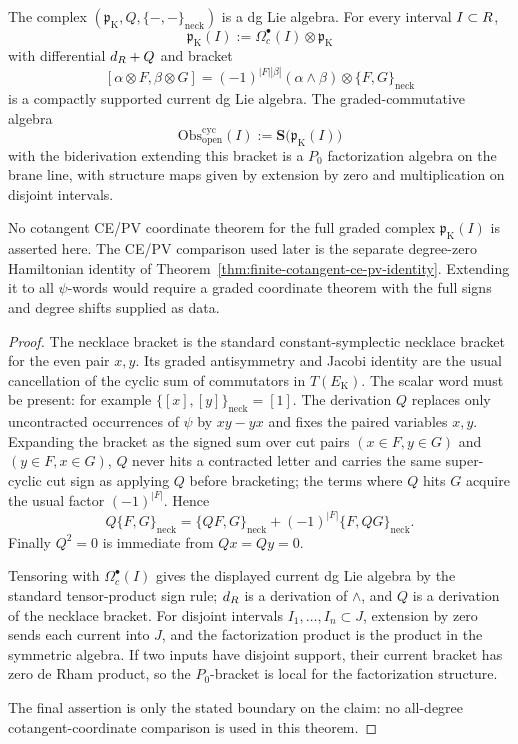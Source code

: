 \documentclass[11pt]{memoir}
\begin{document}
\begin{thm}
\label{thm:primitive-cyclic-koszul-p0-model}
  The complex
  \((\mathfrak p_{\mathrm K},Q,\{-,-\}_{\mathrm{neck}})\) is a dg Lie
  algebra.  For every interval \(I\subset R\),
  \[
    \mathfrak p_{\mathrm K}(I)
      :=\Omega_c^\bullet(I)\otimes\mathfrak p_{\mathrm K}
  \]
  with differential \(d_{R}+Q\) and bracket
  \[
    [\alpha\otimes F,\beta\otimes G]
      =(-1)^{|F||\beta|}(\alpha\wedge\beta)\otimes
        \{F,G\}_{\mathrm{neck}}
  \]
  is a compactly supported current dg Lie algebra.  The graded-commutative
  algebra
  \[
    \mathrm{Obs}^{\mathrm{cyc}}_{\mathrm{open}}(I)
      :=\mathbf S\bigl(\mathfrak p_{\mathrm K}(I)\bigr)
  \]
  with the biderivation extending this bracket is a \(P_0\)
  factorization algebra on the brane line, with structure maps given by
  extension by zero and multiplication on disjoint intervals.

  No cotangent CE/PV coordinate theorem for the full graded complex
  \(\mathfrak p_{\mathrm K}(I)\) is asserted here.  The CE/PV comparison
  used later is the separate degree-zero Hamiltonian identity of
  Theorem~\ref{thm:finite-cotangent-ce-pv-identity}.  Extending it to all
  \(\psi\)-words would require a graded coordinate theorem with the full
  signs and degree shifts supplied as data.
\end{thm}

\begin{proof}
  The necklace bracket is the standard constant-symplectic necklace
  bracket for the even pair \(x,y\).  Its graded antisymmetry and Jacobi
  identity are the usual cancellation of the cyclic sum of commutators in
  \(T(E_{\mathrm K})\).  The scalar word must be present: for example
  \(\{[x],[y]\}_{\mathrm{neck}}=[1]\).  The derivation \(Q\) replaces only
  uncontracted occurrences of \(\psi\) by \(xy-yx\) and fixes the paired
  variables \(x,y\).  Expanding the bracket as the signed sum over cut
  pairs \((x\in F,y\in G)\) and \((y\in F,x\in G)\), \(Q\) never hits a
  contracted letter and carries the same super-cyclic cut sign as applying
  \(Q\) before bracketing; the terms where \(Q\) hits \(G\) acquire the
  usual factor \((-1)^{|F|}\).  Hence
  \[
    Q\{F,G\}_{\mathrm{neck}}
      =\{QF,G\}_{\mathrm{neck}}
       +(-1)^{|F|}\{F,QG\}_{\mathrm{neck}}.
  \]
  Finally \(Q^2=0\) is immediate from \(Qx=Qy=0\).

  Tensoring with \(\Omega_c^\bullet(I)\) gives the displayed current dg
  Lie algebra by the standard tensor-product sign rule; \(d_{R}\) is a
  derivation of \(\wedge\), and \(Q\) is a derivation of the necklace
  bracket.  For disjoint intervals \(I_1,\ldots,I_n\subset J\), extension
  by zero sends each current into \(J\), and the factorization product is
  the product in the symmetric algebra.  If two inputs have disjoint
  support, their current bracket has zero de Rham product, so the
  \(P_0\)-bracket is local for the factorization structure.

  The final assertion is only the stated boundary on the claim: no
  all-degree cotangent-coordinate comparison is used in this theorem.
\end{proof}
\end{document}
